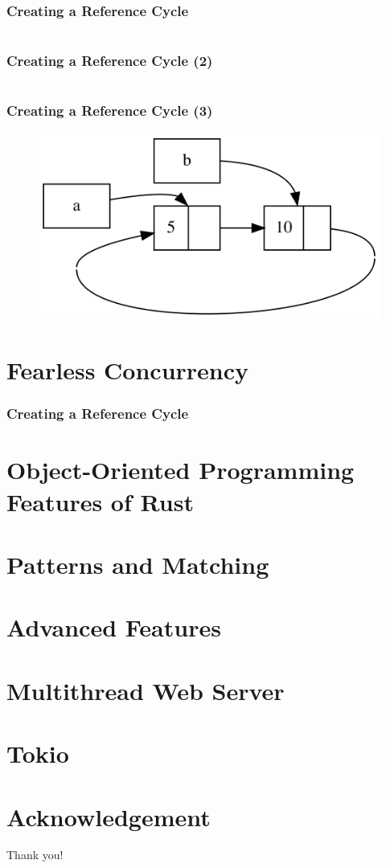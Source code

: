 \documentclass{beamer}
\begin{document}
\begin{frame}[fragile]
	\frametitle{Creating a Reference Cycle}
	\inputminted[fontsize=\scriptsize]{rust}{./code/smart13.rs}
\end{frame} 

\begin{frame}[fragile]
	\frametitle{Creating a Reference Cycle (2)}
	\inputminted[fontsize=\scriptsize]{rust}{./code/smart14.rs}
\end{frame} 


\begin{frame}[fragile]
	\frametitle{Creating a Reference Cycle (3)}
	\begin{figure}
		\centering
		\includegraphics[width=0.99\linewidth]{img/trpl15-04}
	\end{figure}
	
\end{frame} 

\section{Fearless Concurrency}

\begin{frame}[fragile]
	\frametitle{Creating a Reference Cycle}
	
\end{frame} 

\section{Object-Oriented Programming Features of Rust}
\section{Patterns and Matching}
\section{Advanced Features}
\section{Multithread Web Server}
\section{Tokio}

\section*{Acknowledgement}
\begin{frame}
	\Huge{\centerline{Thank you!}}
\end{frame}
\end{document}
